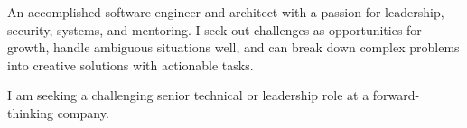 An accomplished software engineer and architect with a passion for leadership,
security, systems, and mentoring. I seek out challenges as opportunities for
growth, handle ambiguous situations well, and can break down complex problems
into creative solutions with actionable tasks.

I am seeking a challenging senior technical or leadership role at a
forward-thinking company.
